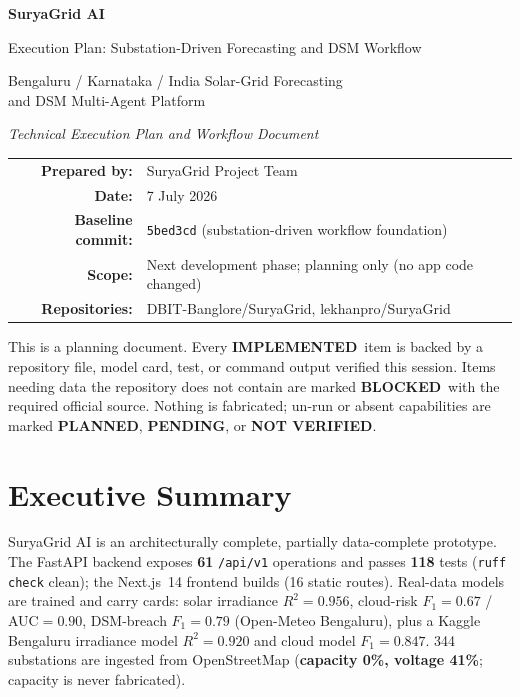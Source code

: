 \documentclass[11pt,a4paper]{article}
\newcommand{\stImpl}{\textcolor{cok}{\textbf{IMPLEMENTED}}}
\newcommand{\stPend}{\textcolor{cpart}{\textbf{PENDING}}}
\newcommand{\stB}{\textcolor{cmiss}{\textbf{BLOCKED}}}
\newcommand{\stPlan}{\textcolor{cplan}{\textbf{PLANNED}}}
\newcommand{\stNV}{\textcolor{cnv}{\textbf{NOT VERIFIED}}}
\newcommand{\code}[1]{\texttt{\small #1}}
\begin{document}
\begin{titlepage}
\centering
\vspace*{2.2cm}
{\Huge\bfseries SuryaGrid AI\par}
\vspace{0.5cm}
{\LARGE Execution Plan: Substation-Driven Forecasting and DSM Workflow\par}
\vspace{0.8cm}
{\large Bengaluru / Karnataka / India Solar-Grid Forecasting\\ and DSM Multi-Agent Platform\par}
\vspace{2cm}
{\large\itshape Technical Execution Plan and Workflow Document\par}
\vspace{1.5cm}
\begin{tabular}{rl}
\textbf{Prepared by:} & SuryaGrid Project Team\\[4pt]
\textbf{Date:} & 7 July 2026\\[4pt]
\textbf{Baseline commit:} & \code{5bed3cd} (substation-driven workflow foundation)\\[4pt]
\textbf{Scope:} & Next development phase; planning only (no app code changed)\\[4pt]
\textbf{Repositories:} & DBIT-Banglore/SuryaGrid, lekhanpro/SuryaGrid\\
\end{tabular}
\vfill
{\footnotesize This is a planning document. Every \stImpl\ item is backed by a repository file,
model card, test, or command output verified this session. Items needing data the repository
does not contain are marked \stB\ with the required official source. Nothing is fabricated;
un-run or absent capabilities are marked \stPlan, \stPend, or \stNV.\par}
\end{titlepage}

\tableofcontents
\newpage

\section{Executive Summary}
SuryaGrid AI is an architecturally complete, partially data-complete prototype. The FastAPI
backend exposes \textbf{61} \code{/api/v1} operations and passes \textbf{118} tests
(\code{ruff check} clean); the Next.js~14 frontend builds (16 static routes). Real-data models
are trained and carry cards: solar irradiance $R^2=0.956$, cloud-risk $F_1=0.67$ / AUC$=0.90$,
DSM-breach $F_1=0.79$ (Open-Meteo Bengaluru), plus a Kaggle Bengaluru irradiance model
$R^2=0.920$ and cloud model $F_1=0.847$. 344 substations are ingested from OpenStreetMap
(\textbf{capacity 0\%, voltage 41\%}; capacity is never fabricated).
\end{document}
